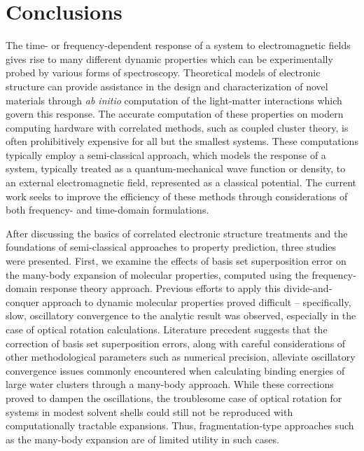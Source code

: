 \chapter{Conclusions} \label{ch:conc} The time- or frequency-dependent
response of a system to electromagnetic fields gives rise to many different
dynamic properties which can be experimentally probed by various forms
of spectroscopy. Theoretical models of electronic structure can provide
assistance in the design and characterization of novel materials through
\textit{ab initio} computation of the light-matter interactions which
govern this response. The accurate computation of these properties on
modern computing hardware with correlated methods, such as coupled cluster
theory, is often prohibitively expensive for all but the smallest systems.
These computations typically employ a semi-classical approach, which
models the response of a system, typically treated as a quantum-mechanical
wave function or density,
to an external electromagnetic field, represented as a classical potential.
The current work seeks to improve the efficiency of these methods through
considerations of both frequency- and time-domain formulations.

After discussing the basics of correlated electronic structure treatments
and the foundations of semi-classical approaches to property prediction,
three studies were presented. First, we examine the effects of basis set
superposition error on the many-body expansion of molecular properties,
computed using the frequency-domain response theory approach. Previous
efforts to apply this divide-and-conquer approach to dynamic molecular
properties proved difficult -- specifically, slow, oscillatory convergence
to the analytic result was observed, especially in the case of optical
rotation calculations. Literature precedent suggests that the correction of
basis set superposition errors, along with careful considerations of other
methodological parameters such as numerical precision, alleviate oscillatory
convergence issues commonly encountered when calculating binding energies of
large water clusters through a many-body approach. While these corrections
proved to dampen the oscillations, the troublesome case of optical rotation
for systems in modest solvent shells could still not be reproduced with
computationally tractable expansions. Thus, fragmentation-type approaches
such as the many-body expansion are of limited utility in such cases.

